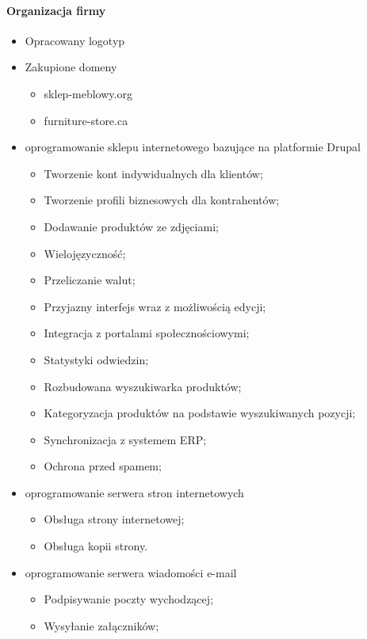			\paragraph{Organizacja firmy}
				\begin{itemize}
					\item Opracowany logotyp
					\item Zakupione domeny
						\begin{itemize}
							\item sklep-meblowy.org
							\item furniture-store.ca
						\end{itemize}
					\item oprogramowanie sklepu internetowego bazujące na platformie Drupal
						\begin{itemize}
							\item Tworzenie kont indywidualnych dla klientów;
							\item Tworzenie profili biznesowych dla kontrahentów;
							\item Dodawanie produktów ze zdjęciami;
							\item Wielojęzyczność;
							\item Przeliczanie walut;
							\item Przyjazny interfejs wraz z możliwością edycji;
							\item Integracja z portalami społecznościowymi;
							\item Statystyki odwiedzin;
							\item Rozbudowana wyszukiwarka produktów;
							\item Kategoryzacja produktów na podstawie wyszukiwanych pozycji;
							\item Synchronizacja z systemem ERP;
							\item Ochrona przed spamem;
						\end{itemize}
					\item oprogramowanie serwera stron internetowych
						\begin{itemize}
							\item Obsługa strony internetowej; 
							\item Obsługa kopii strony. 
						\end{itemize}
					\item oprogramowanie serwera wiadomości e-mail
						\begin{itemize}
							\item Podpisywanie poczty wychodzącej;
							\item Wysyłanie załączników;

\end{itemize}
\end{itemize}
